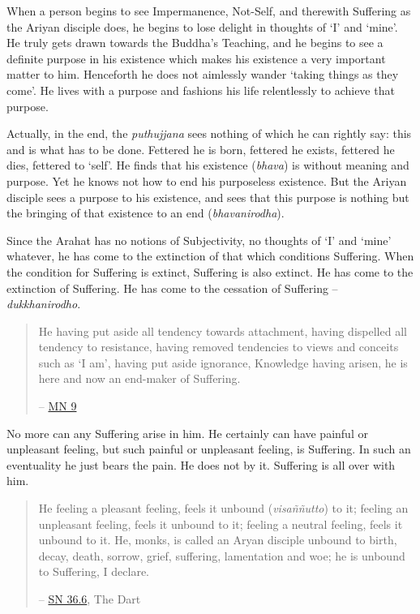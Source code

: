 When a person begins to see Impermanence, Not-Self, and therewith Suffering as the Ariyan disciple does, he begins to lose delight in thoughts of `I' and `mine'. He truly gets drawn towards the Buddha's Teaching, and he begins to see a definite purpose in his existence which makes his existence a very important matter to him. Henceforth he does not aimlessly wander `taking things as they come'. He lives with a purpose and fashions his life relentlessly to achieve that purpose.

Actually, in the end, the \emph{puthujjana} sees nothing of which he can rightly say: this and  is what has to be done. Fettered he is born, fettered he exists, fettered he dies, fettered to `self'. He finds that his existence (\emph{bhava}) is without meaning and purpose. Yet he knows not how to end his purposeless existence. But the Ariyan disciple sees a purpose to his existence, and sees that this purpose is nothing but the bringing of that existence to an end (\emph{bhavanirodha}).

Since the Arahat has no notions of Subjectivity, no thoughts of `I' and `mine' whatever, he has come to the extinction of that which conditions Suffering. When the condition for Suffering is extinct, Suffering is also extinct. He has come to the extinction of Suffering. He has come to the cessation of Suffering -- \emph{dukkhanirodho}.

\begin{quote}
He having put aside all tendency towards attachment, having dispelled all tendency to resistance, having removed tendencies to views and conceits such as `I am', having put aside ignorance, Knowledge having arisen, he is here and now an end-maker of Suffering.

 -- \href{https://suttacentral.net/mn9/en/bodhi}{MN 9}
\end{quote}

No more can any Suffering arise in him. He certainly can have painful or unpleasant feeling, but such painful or unpleasant feeling, is  Suffering. In such an eventuality he just bears the pain. He does not  by it. Suffering is all over with him.

\begin{quote}
He feeling a pleasant feeling, feels it unbound (\emph{visaññutto}) to it; feeling an unpleasant feeling, feels it unbound to it; feeling a neutral feeling, feels it unbound to it. He, monks, is called an Aryan disciple unbound to birth, decay, death, sorrow, grief, suffering, lamentation and woe; he is unbound to Suffering, I declare.

 -- \href{https://suttacentral.net/sn36.6/en/bodhi}{SN 36.6}, The Dart
\end{quote}

